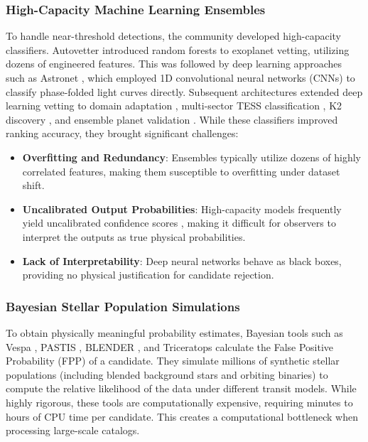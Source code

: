 \subsubsection{High-Capacity Machine Learning Ensembles}
To handle near-threshold detections, the community developed high-capacity classifiers. Autovetter \citep{McCauliff2015} introduced random forests to exoplanet vetting, utilizing dozens of engineered features. This was followed by deep learning approaches such as Astronet \citep{Shallue2018}, which employed 1D convolutional neural networks (CNNs) to classify phase-folded light curves directly. Subsequent architectures extended deep learning vetting to domain adaptation \citep{Ansdell2018}, multi-sector TESS classification \citep{Yu2019, Osborn2020, Olmschenk2021}, K2 discovery \citep{Dattilo2019}, and ensemble planet validation \citep{Armstrong2021}. While these classifiers improved ranking accuracy, they brought significant challenges:
\begin{itemize}
\item \textbf{Overfitting and Redundancy}: Ensembles typically utilize dozens of highly correlated features, making them susceptible to overfitting under dataset shift.
\item \textbf{Uncalibrated Output Probabilities}: High-capacity models frequently yield uncalibrated confidence scores \citep{Guo2017, Niculescu2005}, making it difficult for observers to interpret the outputs as true physical probabilities.
\item \textbf{Lack of Interpretability}: Deep neural networks behave as black boxes, providing no physical justification for candidate rejection.
\end{itemize}

\subsubsection{Bayesian Stellar Population Simulations}
To obtain physically meaningful probability estimates, Bayesian tools such as Vespa \citep{Morton2012, Morton2015, Morton2016}, PASTIS \citep{Diaz2014, Santerne2015}, BLENDER \citep{Torres2011}, and Triceratops \citep{Giacalone2021} calculate the False Positive Probability (FPP) of a candidate. They simulate millions of synthetic stellar populations (including blended background stars and orbiting binaries) to compute the relative likelihood of the data under different transit models. While highly rigorous, these tools are computationally expensive, requiring minutes to hours of CPU time per candidate. This creates a computational bottleneck when processing large-scale catalogs.

